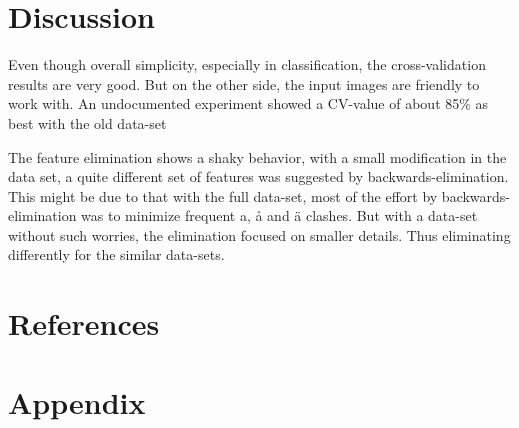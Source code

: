 \documentclass[a4paper,11pt]{article}
\begin{document}
\section{Discussion}

Even though overall simplicity, especially in classification, the cross-validation results are very good.
But on the other side, the input images are friendly to work with.
An undocumented experiment showed a CV-value of about 85\% as best with the old data-set 

The feature elimination shows a shaky behavior,
with a small modification in the data set,
a quite different set of features was suggested by backwards-elimination.
This might be due to that with the full data-set,
most of the effort by backwards-elimination was to minimize frequent a, å and ä clashes.
But with a data-set without such worries, the elimination focused on smaller details.
Thus eliminating differently for the similar data-sets.

\section{References}
\section{Appendix}
\end{document}

